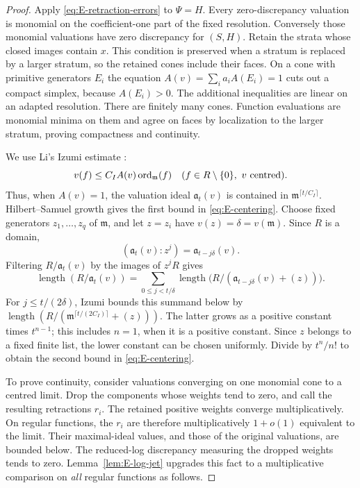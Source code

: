 \begin{proof}
Apply \eqref{eq:E-retraction-errors} to $\Psi=H$.
Every zero-discrepancy valuation is monomial on the coefficient-one
part of the fixed resolution. Conversely those monomial valuations
have zero discrepancy for $(S,H)$. Retain the strata whose closed
images contain $x$. This condition is preserved when a stratum is
replaced by a larger stratum, so the retained cones include their
faces. On a cone with primitive generators $E_i$ the equation
$A(v)=\sum_i a_iA(E_i)=1$ cuts out a compact simplex, because
$A(E_i)>0$. The additional inequalities are linear on an adapted
resolution. There are finitely many cones. Function evaluations are
monomial minima on them and agree on faces by localization to the
larger stratum, proving compactness and continuity.

We use Li's Izumi estimate \cite[Theorem~3.1]{LiIzumi}:
\begin{equation}\label{eq:E-izumi}
 v(f)\le C_I A(v)\operatorname{ord}_{\mathfrak m}(f)
 \quad(f\in R\setminus\{0\},\ v\text{ centred}).
\end{equation}
Thus, when $A(v)=1$, the valuation ideal $\mathfrak a_t(v)$ is contained
in $\mathfrak m^{\lceil t/C_I\rceil}$. Hilbert--Samuel growth gives the
first bound in \eqref{eq:E-centering}.
Choose fixed generators $z_1,\ldots,z_q$ of $\mathfrak m$, and let
$z=z_i$ have $v(z)=\delta=v(\mathfrak m)$. Since $R$ is a domain,
\[
 (\mathfrak a_t(v):z^j)=\mathfrak a_{t-j\delta}(v).
\]
Filtering $R/\mathfrak a_t(v)$ by the images of $z^jR$ gives
\[
 \operatorname{length}(R/\mathfrak a_t(v))
 =\sum_{0\le j<t/\delta}
   \operatorname{length}\bigl(R/(\mathfrak a_{t-j\delta}(v)+(z))\bigr).
\]
For $j\le t/(2\delta)$, Izumi bounds this summand below by
$\operatorname{length}(R/(\mathfrak m^{\lceil t/(2C_I)\rceil}+(z)))$.
The latter grows as a positive constant times $t^{n-1}$; this includes
$n=1$, when it is a positive constant. Since $z$ belongs to a fixed
finite list, the lower constant can be chosen uniformly. Divide by
$t^n/n!$ to obtain the second bound in \eqref{eq:E-centering}.

To prove continuity, consider valuations converging on one monomial
cone to a centred limit. Drop the components whose weights tend to
zero, and call the resulting retractions $r_i$. The retained positive
weights converge multiplicatively. On regular functions, the $r_i$
are therefore multiplicatively $1+o(1)$ equivalent to the limit.
Their maximal-ideal values, and those of the original valuations,
are bounded below. The reduced-log discrepancy measuring the dropped
weights tends to zero. Lemma~\ref{lem:E-log-jet} upgrades this fact to
a multiplicative comparison on \emph{all} regular functions as follows.


\end{proof}
